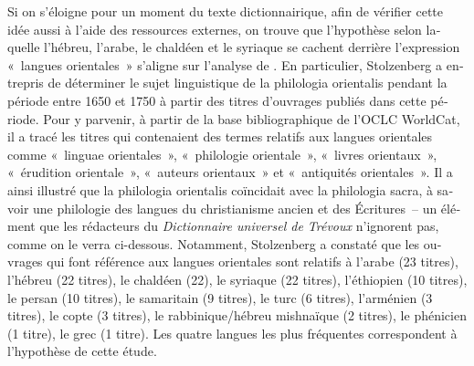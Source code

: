\documentclass[output=paper,colorlinks,citecolor=brown,arabicfont,chinesefont,booklanguage=french]{langscibook}
\begin{document}
\begin{otherlanguage}{french}
Si on s’éloigne pour un moment du texte dictionnairique, afin de vérifier cette idée aussi à l’aide des ressources externes, on trouve que l’hypothèse selon laquelle l’hébreu, l’arabe, le chaldéen et le syriaque se cachent derrière l’expression «~langues orientales~» s’aligne sur l’analyse de \citet{Stolzenberg2015}. En particulier, Stolzenberg a entrepris de déterminer le sujet linguistique de la philologia orientalis pendant la période entre 1650 et 1750 à partir des titres d’ouvrages publiés dans cette période. Pour y parvenir, à partir de la base bibliographique de l’OCLC WorldCat, il a tracé les titres qui contenaient des termes relatifs aux langues orientales comme «~linguae orientales~», «~philologie orientale~», «~livres orientaux~», «~érudition orientale~», «~auteurs orientaux~» et «~antiquités orientales~». Il a ainsi illustré que la philologia orientalis coïncidait avec la philologia sacra, à savoir une philologie des langues du christianisme ancien et des Écritures~– un élément que les rédacteurs du \emph{Dictionnaire universel de Trévoux} n’ignorent pas, comme on le verra ci-dessous. Notamment, Stolzenberg a constaté que les ouvrages qui font référence aux langues orientales sont relatifs à l’arabe (23 titres), l’hébreu (22 titres), le chaldéen (22), le syriaque (22 titres), l’éthiopien (10 titres), le persan (10 titres), le samaritain (9 titres), le turc (6 titres), l’arménien (3 titres), le copte (3 titres), le rabbinique/hébreu mishnaïque (2 titres), le phénicien (1 titre), le grec (1 titre). Les quatre langues les plus fréquentes correspondent à l’hypothèse de cette étude.


\end{otherlanguage}
\end{document}
